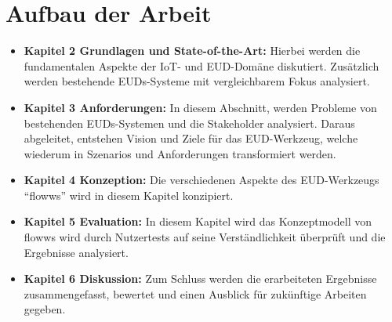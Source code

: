 \section{Aufbau der Arbeit}\label{sec:1_aufbau}
\begin{itemize}
    \item \textbf{Kapitel 2 Grundlagen und State-of-the-Art:} Hierbei werden die fundamentalen Aspekte der \ac{IoT}- und \ac{EUD}-Domäne diskutiert. Zusätzlich werden bestehende \acp{EUD}-Systeme mit vergleichbarem Fokus analysiert.
    \item \textbf{Kapitel 3 Anforderungen:} In diesem Abschnitt, werden Probleme von bestehenden \acp{EUD}-Systemen und die Stakeholder analysiert. Daraus abgeleitet, entstehen Vision und Ziele für das \ac{EUD}-Werkzeug, welche wiederum in Szenarios und Anforderungen transformiert werden.
    \item \textbf{Kapitel 4 Konzeption:} Die verschiedenen Aspekte des \ac{EUD}-Werkzeugs "`flowws"' wird in diesem Kapitel konzipiert.
    \item \textbf{Kapitel 5 Evaluation:} In diesem Kapitel wird das Konzeptmodell von flowws wird durch Nutzertests auf seine Verständlichkeit überprüft und die Ergebnisse analysiert.
    \item \textbf{Kapitel 6 Diskussion:} Zum Schluss werden die erarbeiteten Ergebnisse zusammengefasst, bewertet und einen Ausblick für zukünftige Arbeiten gegeben.
\end{itemize}